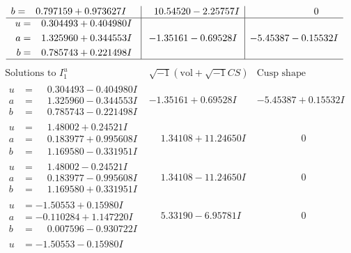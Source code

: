 \documentclass[1p]{elsarticle_modified}
\theoremstyle{definition}
\newcommand{\I}{\sqrt{-1}}
\begin{document}
$$\begin{array}{c|c|c}
\begin{aligned}
b &= \phantom{-}0.797159 + 0.973627 I\end{aligned}
 & \phantom{-}10.54520 - 2.25757 I & \phantom{-0.000000 } 0 \\ \hline\begin{aligned}
u &= \phantom{-}0.304493 + 0.404980 I \\
a &= \phantom{-}1.325960 + 0.344553 I \\
b &= \phantom{-}0.785743 + 0.221498 I\end{aligned}
 & -1.35161 - 0.69528 I & -5.45387 - 0.15532 I\\
 \hline 
 \end{array}$$\newpage$$\begin{array}{c|c|c}  
\text{Solutions to }I^u_{1}& \I (\text{vol} + \sqrt{-1}CS) & \text{Cusp shape}\\
 \hline 
\begin{aligned}
u &= \phantom{-}0.304493 - 0.404980 I \\
a &= \phantom{-}1.325960 - 0.344553 I \\
b &= \phantom{-}0.785743 - 0.221498 I\end{aligned}
 & -1.35161 + 0.69528 I & -5.45387 + 0.15532 I \\ \hline\begin{aligned}
u &= \phantom{-}1.48002 + 0.24521 I \\
a &= \phantom{-}0.183977 + 0.995608 I \\
b &= \phantom{-}1.169580 - 0.331951 I\end{aligned}
 & \phantom{-}1.34108 + 11.24650 I & \phantom{-0.000000 } 0 \\ \hline\begin{aligned}
u &= \phantom{-}1.48002 - 0.24521 I \\
a &= \phantom{-}0.183977 - 0.995608 I \\
b &= \phantom{-}1.169580 + 0.331951 I\end{aligned}
 & \phantom{-}1.34108 - 11.24650 I & \phantom{-0.000000 } 0 \\ \hline\begin{aligned}
u &= -1.50553 + 0.15980 I \\
a &= -0.110284 + 1.147220 I \\
b &= \phantom{-}0.007596 - 0.930722 I\end{aligned}
 & \phantom{-}5.33190 - 6.95781 I & \phantom{-0.000000 } 0 \\ \hline\begin{aligned}
u &= -1.50553 - 0.15980 I \\

\end{aligned}
\end{array}$$
\end{document}
